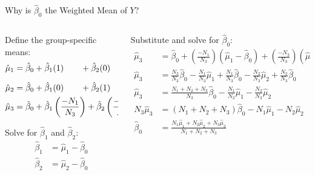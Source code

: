 \documentclass{beamer}\usepackage[]{graphicx}\usepackage[]{color}
\begin{document}
\watermarkon %

\begin{frame}[shrink = 5]{Why is $\hat{\beta}_0$ the Weighted Mean of $Y$?}
  
  \begin{columns}[T]
    \begin{column}{0.4\textwidth}
      
      Define the group-specific means:
      \begin{align*}
        \hat{\mu}_1 &= \hat{\beta}_0 + \hat{\beta}_1 (1) \text{\hspace{20pt}} + 
        \hat{\beta}_2 (0)\\[6pt]
        \hat{\mu}_2 &= \hat{\beta}_0 + \hat{\beta}_1 (0) \text{\hspace{20pt}} + 
        \hat{\beta}_2 (1)\\
        \hat{\mu}_3 &= \hat{\beta}_0 + \hat{\beta}_1 \left( \frac{-N_1}{N_3} \right) + \hat{\beta}_2 \left( \frac{-N_2}{N_3} \right)
      \end{align*}
      
      \pause
      
      Solve for $\hat{\beta}_1$ and $\hat{\beta}_2$:
      \begin{align*}
        \hat{\beta}_1 &= \hat{\mu}_1 - \hat{\beta}_0\\
        \hat{\beta}_2 &= \hat{\mu}_2 - \hat{\beta}_0\\
      \end{align*}
    \end{column}
    
    \pause
    
    \begin{column}{0.6\textwidth}
      Substitute and solve for $\hat{\beta}_0$:
      \begin{align*}
        \hat{\mu}_3 &= \hat{\beta}_0 + \left( \frac{-N_1}{N_3} \right) (\hat{\mu}_1 - \hat{\beta}_0) + \left( \frac{-N_2}{N_3} \right) (\hat{\mu}_2 - \hat{\beta}_0)\\[10pt]
        \hat{\mu}_3 &= \frac{N_3}{N_3}\hat{\beta}_0 - \frac{N_1}{N_3}\hat{\mu}_1 + \frac{N_1}{N_3}\hat{\beta}_0 - \frac{N_2}{N_3}\hat{\mu}_2 + \frac{N_2}{N_3}\hat{\beta}_0\\[10pt]
        \hat{\mu}_3 &= \frac{N_1 + N_2 + N_3}{N_3}\hat{\beta}_0 - \frac{N_1}{N_3}\hat{\mu}_1 - \frac{N_2}{N_3}\hat{\mu}_2\\[10pt]
        N_3\hat{\mu}_3 &= (N_1 + N_2 + N_3)\hat{\beta}_0 - N_1\hat{\mu}_1 - N_2\hat{\mu}_2\\[10pt]
        \hat{\beta}_0 &= \frac{N_1\hat{\mu}_1 + N_2\hat{\mu}_2 + N_3\hat{\mu}_3}{N_1 + N_2 + N_3}
      \end{align*}
    \end{column}
  \end{columns}
  
\end{frame}
\end{document}
